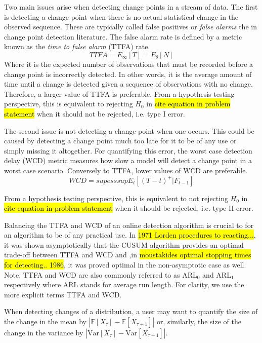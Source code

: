 Two main issues arise when detecting change points in a stream of data. The first is detecting a change point when there is no actual statistical change in the observed sequence. These are typically called false positives or \textit{false alarms} the in change point detection literature. The false alarm rate is defined by a metric known as the \textit{time to false alarm} (TTFA) rate. 
\begin{equation}
TTFA = E_{\infty}[T] = E_{\theta}[N]
\end{equation}
Where it is the expected number of observations that must be recorded before a change point is incorrectly detected. In other words, it is the average amount of time until a change is detected given a sequence of observations with no change. Therefore, a larger value of TTFA is preferable. From a hypothesis testing perspective, this is equivalent to rejecting $H_0$ in \hl{cite equation in problem statement} when it should not be rejected, i.e. type I error.

The second issue is not detecting a change point when one occurs. This could be caused by detecting a change point much too late for it to be of any use or simply missing it altogether. For quantifying this error, the worst case detection delay (WCD) metric measures how slow a model will detect a  change point in a worst case scenario. Conversely to TTFA, lower values of WCD are preferable.
\begin{equation}
WCD = sup esssup E_t[(T-t)^+ | F_{t-1}]
\end{equation}

From a hypothesis testing perspective, this is equivalent to not rejecting $H_0$ in \hl{cite equation in problem statement} when it should be rejected, i.e. type II error.

Balancing the TTFA and WCD of an online detection algorithm is crucial to for an algorithm to be of any practical use. In \hl{1971 Lorden procedures to reacting...}, it was shown asymptotically that the CUSUM algorithm provides an optimal trade-off between TTFA and WCD and ,in \hl{moustakides optimal stopping times for detecting.. 1986}, it was proved optimal in the non-asymptotic case as well. Note, TTFA and WCD are also commonly referred to as ARL$_0$ and ARL$_1$ respectively where ARL stands for average run length. For clarity, we use the more explicit terms TTFA and WCD.

When detecting changes of a distribution, a user may want to quantify the size of the change in the mean by
$|\mathbb{E}[X_{\tau}]-\mathbb{E}[X_{\tau+1}]|$ or, similarly, the size of the change in the variance by $|\text{Var}[X_{\tau}]-\text{Var}[X_{\tau+1}]|$.

